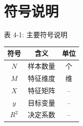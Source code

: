 \section{符号说明}

\begin{center}
  表 4-1: 主要符号说明\\[0.6em]
  \begin{tabular}{ccc}
    \toprule
    \textbf{符号} & \textbf{含义} & \textbf{单位} \\
    \midrule
    $N$   & 样本数量 & 个 \\
    $M$   & 特征维度 & 维 \\
    $X$   & 特征矩阵 & -- \\
    $y$   & 目标变量 & -- \\
    $R^2$ & 决定系数 & -- \\
    \bottomrule
  \end{tabular}
\end{center}
